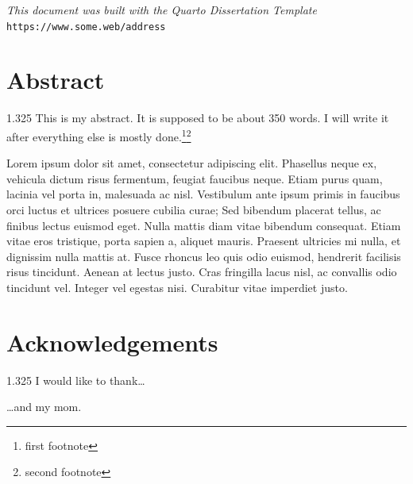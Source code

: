 \documentclass[
    fontsize=11,
    paper=letter,
    twoside=true,  %
    open=right,
    chapterprefix=true,  %
    appendixprefix=true,  %
    numbers=noendperiod,  %
    toc=flat,  %
    usegeometry=true  %
  ]{scrreprt}
\newlength{\blankline}
\renewcommand{\indent}{\hspace{0.5in}}
\begin{document}
\thispagestyle{plain}
\rule{0pt}{7in}
\begin{center}
    \textit{This document was built with the Quarto Dissertation Template}\\
    \texttt{https://www.some.web/address}
\end{center}  %
\cleardoublepage

\chapter*{Abstract}
\begin{spacing}{1.325} %
\indent
This is my abstract. It is supposed to be about 350 words. I will write it after everything else is mostly done.\footnote{first footnote}\footnote{second footnote}

Lorem ipsum dolor sit amet, consectetur adipiscing elit. Phasellus neque ex, vehicula dictum risus fermentum, feugiat faucibus neque. Etiam purus quam, lacinia vel porta in, malesuada ac nisl. Vestibulum ante ipsum primis in faucibus orci luctus et ultrices posuere cubilia curae; Sed bibendum placerat tellus, ac finibus lectus euismod eget. Nulla mattis diam vitae bibendum consequat. Etiam vitae eros tristique, porta sapien a, aliquet mauris. Praesent ultricies mi nulla, et dignissim nulla mattis at. Fusce rhoncus leo quis odio euismod, hendrerit facilisis risus tincidunt. Aenean at lectus justo. Cras fringilla lacus nisl, ac convallis odio tincidunt vel. Integer vel egestas nisi. Curabitur vitae imperdiet justo.
\end{spacing}  %
\cleardoublepage

\chapter*{Acknowledgements}
\begin{spacing}{1.325}
\indent
I would like to thank\ldots

\ldots{}and my mom.
\end{spacing}
\cleardoublepage

\setcounter{tocdepth}{\sectiontocdepth}
\tableofcontents
\end{document}
